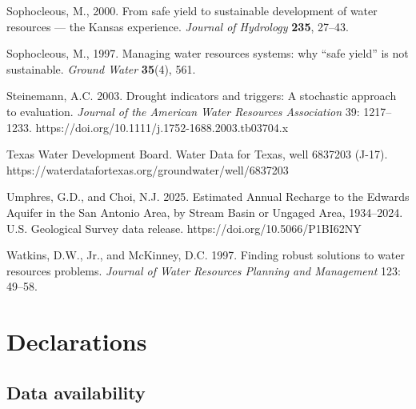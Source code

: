 \documentclass[11pt]{article}
\begin{document}
Sophocleous, M., 2000. From safe yield to sustainable development of water resources --- the
Kansas experience. \emph{Journal of Hydrology} \textbf{235}, 27--43.

Sophocleous, M., 1997. Managing water resources systems: why ``safe yield'' is not
sustainable. \emph{Ground Water} \textbf{35}(4), 561.

Steinemann, A.C. 2003. Drought indicators and triggers: A stochastic
approach to evaluation. \emph{Journal of the American Water Resources
Association} 39: 1217--1233.
https://doi.org/10.1111/j.1752-1688.2003.tb03704.x

Texas Water Development Board. Water Data for Texas, well 6837203
(J-17). https://waterdatafortexas.org/groundwater/well/6837203

Umphres, G.D., and Choi, N.J. 2025. Estimated Annual Recharge to the
Edwards Aquifer in the San Antonio Area, by Stream Basin or Ungaged
Area, 1934--2024. U.S. Geological Survey data release.
https://doi.org/10.5066/P1BI62NY

Watkins, D.W., Jr., and McKinney, D.C. 1997. Finding robust solutions to
water resources problems. \emph{Journal of Water Resources Planning and
Management} 123: 49--58.

\section*{Declarations}

\subsection*{Data availability}
\end{document}
